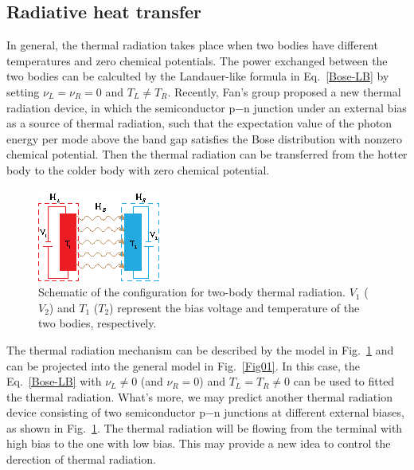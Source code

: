\documentclass[aps
,twocolumn
,floatfix,footinbib]{revtex4-1}
\begin{document}
\subsection{Radiative heat transfer}
In general, the thermal radiation takes place when two bodies have different temperatures and zero chemical potentials. The power exchanged between the two bodies can be calculted by the Landauer-like formula in Eq.~\ref{Bose-LB} by setting $\nu_{L}=\nu_{R}=0$ and $T_{L}\neq T_{R}$\citep{biehs2011nanoscale,moncada2015magnetic,ben2016photon,zhu2016persistent,latella2017giant,zhu2018theory,ben2019thermal}. Recently, Fan's group proposed a new thermal radiation device\cite{chen2015heat,chen2016near}, in which the semiconductor p−n junction under an external bias as a source of thermal radiation, such that the expectation value of the photon energy per mode above the band gap satisfies the Bose distribution with nonzero chemical potential\cite{wurfel1982chemical}. Then the thermal radiation can be transferred from the hotter body to the colder body with zero chemical potential. 
%
\begin{figure}
\centering
\includegraphics[width=8 cm]{radiation.eps}
\caption{ Schematic of the configuration for two-body thermal radiation. $V_{1}$ ($V_{2}$) and $T_{1}$ ($T_{2}$) represent the bias voltage and temperature of the two bodies, respectively. }
\label{thermal-radiation}
\end{figure}
%

The thermal radiation mechanism can be described by the model in Fig.~\ref{thermal-radiation} and can be projected into the general model in Fig.~\ref{Fig01}. In this case, the Eq.~\ref{Bose-LB} with $\nu_{L}\neq0$ (and $\nu_{R}=0$) and $T_{L}=T_{R}\neq0$ can be used to fitted the thermal radiation. What's more, we may predict another thermal radiation device consisting of two semiconductor p−n junctions at different external biases, as shown in Fig.~\ref{thermal-radiation}. The thermal radiation will be flowing from the terminal with high bias to the one with low bias. This may provide a new idea to control the derection of thermal radiation.
\end{document}
